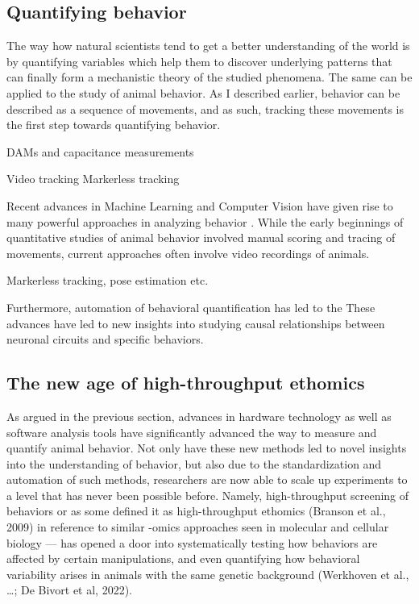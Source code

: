 \subsection{Quantifying behavior}
\label{sub:quantbehavior}

The way how natural scientists tend to get a better understanding of the world is by quantifying variables which help them to discover underlying patterns that can finally form a mechanistic theory of the studied phenomena. The same can be applied to the study of animal behavior. As I described earlier, behavior can be described as a sequence of movements, and as such, tracking these movements is the first step towards quantifying behavior.

DAMs and capacitance measurements

Video tracking Markerless tracking

Recent advances in Machine Learning and Computer Vision have given rise to many powerful approaches in analyzing behavior \needscite. While the early beginnings of quantitative studies of animal behavior involved manual scoring and tracing of movements, current approaches often involve video recordings of animals.

Markerless tracking, pose estimation etc.

Furthermore, automation of behavioral quantification has led to the These advances have led to new insights into studying causal relationships between neuronal circuits and specific behaviors.


\subsection{The new age of high-throughput ethomics}
\label{sub:newage}

As argued in the previous section, advances in hardware technology as well as software analysis tools have significantly advanced the way to measure and quantify animal behavior. Not only have these new methods led to novel insights into the understanding of behavior, but also due to the standardization and automation of such methods, researchers are now able to scale up experiments to a level that has never been possible before. Namely, high-throughput screening of behaviors or as some defined it as high-throughput ethomics \needscite(Branson et al., 2009) \textemdash in reference to similar -omics approaches seen in molecular and cellular biology — has opened a door into systematically testing how behaviors are affected by certain manipulations, and even quantifying how behavioral variability arises in animals with the same genetic background \needscite(Werkhoven et al., …; De Bivort et al, 2022).

